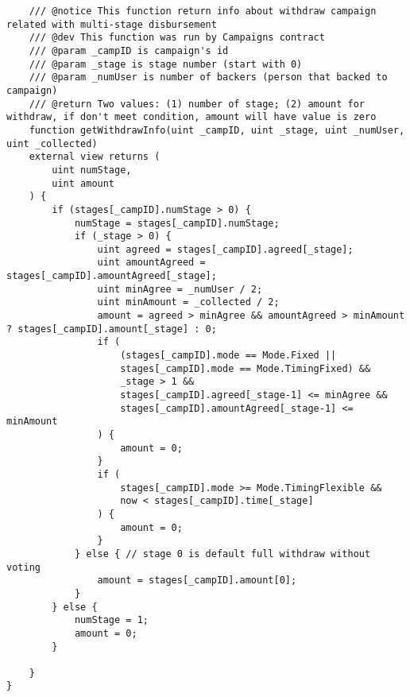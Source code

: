 \documentclass[../main-report.tex]{subfiles}
\begin{document}
\begin{lstlisting}
    /// @notice This function return info about withdraw campaign related with multi-stage disbursement
    /// @dev This function was run by Campaigns contract
    /// @param _campID is campaign's id
    /// @param _stage is stage number (start with 0)
    /// @param _numUser is number of backers (person that backed to campaign)
    /// @return Two values: (1) number of stage; (2) amount for withdraw, if don't meet condition, amount will have value is zero
    function getWithdrawInfo(uint _campID, uint _stage, uint _numUser, uint _collected)
    external view returns (
        uint numStage,
        uint amount
    ) {
        if (stages[_campID].numStage > 0) {
            numStage = stages[_campID].numStage;
            if (_stage > 0) {
                uint agreed = stages[_campID].agreed[_stage];
                uint amountAgreed = stages[_campID].amountAgreed[_stage];
                uint minAgree = _numUser / 2;
                uint minAmount = _collected / 2;
                amount = agreed > minAgree && amountAgreed > minAmount ? stages[_campID].amount[_stage] : 0;
                if (
                    (stages[_campID].mode == Mode.Fixed ||
                    stages[_campID].mode == Mode.TimingFixed) &&
                    _stage > 1 &&
                    stages[_campID].agreed[_stage-1] <= minAgree &&
                    stages[_campID].amountAgreed[_stage-1] <= minAmount
                ) {
                    amount = 0;
                }
                if (
                    stages[_campID].mode >= Mode.TimingFlexible &&
                    now < stages[_campID].time[_stage]
                ) {
                    amount = 0;
                }
            } else { // stage 0 is default full withdraw without voting
                amount = stages[_campID].amount[0];
            }
        } else {
            numStage = 1;
            amount = 0;
        }

    }
}
\end{lstlisting}
\end{document}
